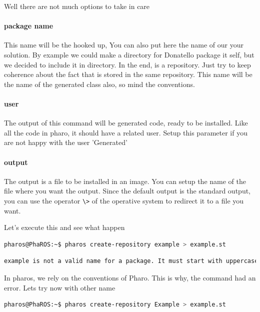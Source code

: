 \documentclass[a4paper,10pt,twoside]{book}
\begin{document}
					Well there are not much options to take in care 
					
					
					\paragraph{package name}
						This name will be the hooked up, You can also put here the name of our your solution. By example we could make a directory for Donatello package it self, but we decided to include it in \fwkName{} directory. In the end, is a repository. Just try to keep coherence about the fact that is stored in the same repository.
						This name will be the name of the generated class also, so mind the conventions.
						
					\paragraph{user}
						The output of this command will be generated code, ready to be installed. Like all the code in pharo, it should have a related user. Setup this parameter if you are not happy with the user 'Generated' 
						
					\paragraph{output}
						The output is a file to be installed in an image. You can setup the name of the file where you want the output. Since the default output is the standard output, you can use the operator \verb|\>| of the operative system to redirect it to a file you want. 
						
					
					Let's execute this and see what happen 
					
					\begin{lstlisting}[language=bash,title={ Repository creation }]
						pharos@PhaROS:~$ pharos create-repository example > example.st
					\end{lstlisting} 
				
					\begin{lstlisting}[language=bash,title={ Repository creation  - Error }]
						example is not a valid name for a package. It must start with uppercase. ThisIsACorrectPackageName 
					\end{lstlisting} 
					
					
					In pharos, we rely on the conventions of Pharo. This is why, the command had an error. Lets try now with other name
					
					\begin{lstlisting}[language=bash,title={ Repository creation }]
						pharos@PhaROS:~$ pharos create-repository Example > example.st
					\end{lstlisting} 
					
\end{document}
